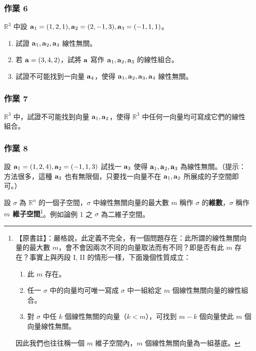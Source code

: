 \subsubsection*{作業 6}\label{hw:b6s-1-6}
$\mathbb{R}^3$ 中設 $\boldsymbol{\mathbf{a}}_1=(1, 2, 1), \boldsymbol{\mathbf{a}}_2=(2, -1, 3), \boldsymbol{\mathbf{a}}_3=(-1, 1, 1)$。
\begin{enumerate}[label=(\roman*), leftmargin=2em]
  \item 試證 $\boldsymbol{\mathbf{a}}_1, \boldsymbol{\mathbf{a}}_2, \boldsymbol{\mathbf{a}}_3$ 線性無關。
  \item 若 $\boldsymbol{\mathbf{a}}=(3, 4, 2)$，試將 $\boldsymbol{\mathbf{a}}$ 寫作 $\boldsymbol{\mathbf{a}}_1, \boldsymbol{\mathbf{a}}_2, \boldsymbol{\mathbf{a}}_3$ 的線性組合。
  \item 試證不可能找到一向量 $\boldsymbol{\mathbf{a}}_4$，使得 $\boldsymbol{\mathbf{a}}_1, \boldsymbol{\mathbf{a}}_2, \boldsymbol{\mathbf{a}}_3, \boldsymbol{\mathbf{a}}_4$ 線性無關。
\end{enumerate}

\subsubsection*{作業 7}\label{hw:b6s-1-7}
$\mathbb{R}^3$ 中，試證不可能找到向量 $\boldsymbol{\mathbf{a}}_1, \boldsymbol{\mathbf{a}}_2$，使得 $\mathbb{R}^3$ 中任何一向量均可寫成它們的線性組合。

\subsubsection*{作業 8}\label{hw:b6s-1-8}
設 $\boldsymbol{\mathbf{a}}_1=(1, 2, 4), \boldsymbol{\mathbf{a}}_2=(-1, 1, 3)$ 試找一 $\boldsymbol{\mathbf{a}}_3$ 使得 $\boldsymbol{\mathbf{a}}_1, \boldsymbol{\mathbf{a}}_2, \boldsymbol{\mathbf{a}}_3$ 為線性無關。（提示：方法很多，這種 $\boldsymbol{\mathbf{a}}_3$ 也有無限個，只要找一向量不在 $\boldsymbol{\mathbf{a}}_1, \boldsymbol{\mathbf{a}}_2$ 所展成的子空間即可。）

\begin{definition*}[*]\label{def:b6s-1-dim}
設 $\sigma$ 為 $\mathbb{R}^n$ 的一個子空間，$\sigma$ 中線性無關向量的最大數 $m$ 稱作 $\sigma$ 的\textbf{維數}，$\sigma$ 稱作 \textbf{$m$ 維子空間}\footnote{【原書註】：嚴格說，此定義不完全，有一個問題存在：此所謂的線性無關向量的最大數 $m$，會不會因兩次不同的向量取法而有不同？即是否有此 $m$ 存在？事實上與丙段 I, II 的情形一樣，下面幾個性質成立：
\begin{enumerate}[label=(\roman*), leftmargin=2em]
  \item 此 $m$ 存在。
  \item 任一 $\sigma$ 中的向量均可唯一寫成 $\sigma$ 中一組給定 $m$ 個線性無關向量的線性組合。
  \item 對 $\sigma$ 中任 $k$ 個線性無關的向量（$k < m$），可找到 $m-k$ 個向量使此 $m$ 個向量線性無關。
\end{enumerate}
因此我們也往往稱一個 $m$ 維子空間內，$m$ 個線性無關向量為一組基底。}。例如論例 1 之 $\sigma$ 為二維子空間。
\end{definition*}

